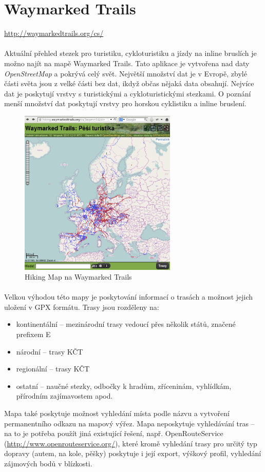 \documentclass[11pt,a4paper,titlepage,oneside]{book}
\begin{document}
	
	\section{Waymarked Trails}
		\url{http://waymarkedtrails.org/cs/}
		\paragraph{} Aktuální přehled stezek pro turistiku, cykloturistiku a jízdy na inline bruslích je možno najít na mapě Waymarked Trails\cite{Waymarked}. Tato aplikace je vytvořena nad daty \textit{OpenStreetMap} a pokrývá celý svět. Největší množství dat je v Evropě, zbylé části světa jsou z velké části bez dat, ikdyž občas nějaká data obsahují. Nejvíce dat je poskytují vrstvy s turistickými a cykloturistickými stezkami. O poznání menší množství dat poskytují vrstvy pro horskou cyklistiku a inline bruslení.

		\begin{figure}[!h]
			\begin{center}
				\includegraphics[width=7.5cm]{obrazky/waymarkedTrails.png}
				\caption{Hiking Map na Waymarked Trails}
			\end{center}
		\end{figure}
	
		\paragraph{} Velkou výhodou této mapy je poskytování informací o trasách a možnost jejich uložení v GPX formátu. Trasy jsou rozděleny na:
	\begin{itemize}
		 \item kontinentální -- mezinárodní trasy vedoucí přes několik států, značené prefixem E
		 \item národní -- trasy KČT
		 \item regionální -- trasy KČT
     		 \item ostatní -- naučné stezky, odbočky k hradům, zříceninám, vyhlídkám, přírodním zajímavostem apod.
	\end{itemize}
  Mapa také poskytuje možnost vyhledání místa podle názvu a vytvoření permanentního odkazu na mapový výřez. Mapa neposkytuje vyhledávání tras -- na to je potřeba použít jiná existující řešení, např. OpenRouteService (\url{http://www.openrouteservice.org/}), které kromě vyhledání trasy pro určitý typ dopravy (autem, na kole, pěšky) poskytuje i její export, výškový profil, vyhledání zájmových bodů v blízkosti.
\end{document}
